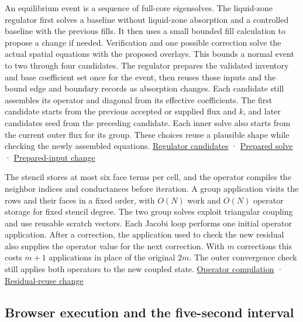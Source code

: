 \documentclass[11pt,letterpaper]{article}
\begin{document}
An equilibrium event is a sequence of full-core eigensolves. The liquid-zone regulator
first solves a baseline without liquid-zone absorption and a controlled baseline with
the previous fills. It then uses a small bounded fill calculation to propose a change if
needed. Verification and one possible correction solve the actual spatial equations with
the proposed overlays. This bounds a normal event to two through four candidates. The
regulator prepares the validated inventory and base coefficient set once for the event,
then reuses those inputs and the bound edge and boundary records as absorption changes.
Each candidate still assembles its operator and diagonal from its effective
coefficients. The first candidate starts from the previous accepted or supplied flux and
\(k\), and later candidates seed from the preceding candidate. Each inner solve also
starts from the current outer flux for its group. These choices reuse a plausible shape
while checking the newly assembled equations.
\href{https://github.com/hkkho/CRS/blob/4341ae8881f5827988c3d8b1859aa9e8f13cd8a6/src/ReactorSim.Core/Domain/PracticeLiquidZoneRrsContracts.cs\#L1420}{Regulator
candidates} ·
\href{https://github.com/hkkho/CRS/blob/4341ae8881f5827988c3d8b1859aa9e8f13cd8a6/src/ReactorSim.Core/Domain/FullCoreDiffusionModelContracts.cs\#L490}{Prepared
solve} ·
\href{https://github.com/hkkho/CRS/commit/e0c839718a46dd30159c33b4785cbfd4ea421cb1}{Prepared-input
change}

The stencil stores at most six face terms per cell, and the operator compiles the
neighbor indices and conductances before iteration. A group application visits the rows
and their faces in a fixed order, with \(O(N)\) work and \(O(N)\) operator storage for
fixed stencil degree. The two group solves exploit triangular coupling and use reusable
scratch vectors. Each Jacobi loop performs one initial operator application. After a
correction, the application used to check the new residual also supplies the operator
value for the next correction. With \(m\) corrections this costs \(m+1\) applications in
place of the original \(2m\). The outer convergence check still applies both operators
to the new coupled state.
\href{https://github.com/hkkho/CRS/blob/4341ae8881f5827988c3d8b1859aa9e8f13cd8a6/src/ReactorSim.Core/Domain/SpatialOperatorContracts.cs\#L1039}{Operator
compilation} ·
\href{https://github.com/hkkho/CRS/commit/15fc41460f9920d3cf73cec399c2a4a62626ee8e}{Residual-reuse
change}

\subsection{Browser execution and the five-second
interval}\label{browser-execution-and-the-five-second-interval}
\end{document}
